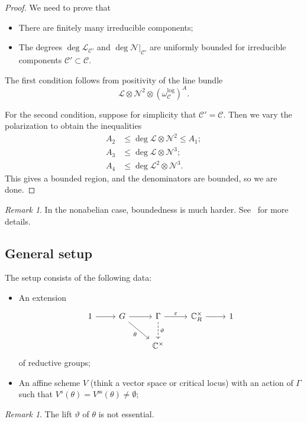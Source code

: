 \documentclass[10pt]{amsart}
\theoremstyle{definition}
\theoremstyle{remark}
\newtheorem{rmk}[thm]{Remark}
\theoremstyle{plain}
\theoremstyle{definition}
\theoremstyle{remark}
\newcommand{\C}{\mathbb{C}}
\newcommand{\ep}{\varepsilon}
\newcommand{\mc}[1]{\mathcal{#1}}
\newcommand{\mr}[1]{\mathrm{#1}}
\newcommand{\1}{\mathbf{1}}
\newcommand{\2}{\mathbf{2}}
\newcommand{\3}{\mathbf{3}}
\begin{document}
\begin{proof}
    We need to prove that
    \begin{itemize}
        \item There are finitely many irreducible components;
        \item The degrees $\deg \mc{L}_{\mc{C}'}$ and $\deg \mc{N}|_{\mc{C}'}$ are uniformly bounded for irreducible components $\mc{C}' \subset \mc{C}$.
    \end{itemize}
    The first condition follows from positivity of the line bundle
    \[ \mc{L} \otimes \mc{N}^2 \otimes (\omega_{\mc{C}}^{\log})^A. \]
    
    For the second condition, suppose for simplicity that $\mc{C}' = \mc{C}$. Then we vary the polarization to obtain the inequalities
    \begin{align*}
        A_2 &\leq \deg \mc{L} \otimes \mc{N}^2 \leq A_1; \\
        A_3 &\leq \deg \mc{L} \otimes \mc{N}^3; \\
        A_4 &\leq \deg \mc{L}^2 \otimes \mc{N}^3 .
    \end{align*}
    This gives a bounded region, and the denominators are bounded, so we are done.
\end{proof}

\begin{rmk}
    In the nonabelian case, boundedness is much harder. See~\cite{bounded} for more details.  
\end{rmk}

\subsection{General setup}%
\label{sub:General setup}

The setup consists of the following data:
\begin{itemize}
    \item An extension
        \begin{equation*}
        \begin{tikzcd}
            1 \ar{r} & G \ar{r} \ar[swap]{dr}{\theta} & \Gamma \ar{r}{\ep} \ar[dashrightarrow]{d}{\vartheta} & \C_R^{\times} \ar{r} & 1 \\
            & & \C^{\times}
        \end{tikzcd}
        \end{equation*}
        of reductive groups;
    \item An affine scheme $V$ (think a vector space or critical locus) with an action of $\Gamma$ such that $V^s(\theta) = V^{\mr{ss}}(\theta) \neq \emptyset$;
\end{itemize}
\begin{rmk}
    The lift $\vartheta$ of $\theta$ is not essential.
\end{rmk}
\end{document}
